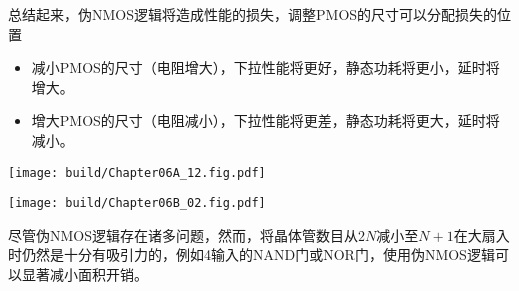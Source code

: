 总结起来，伪NMOS逻辑将造成性能的损失，调整PMOS的尺寸可以分配损失的位置
\begin{itemize}
    \item 减小PMOS的尺寸（电阻增大），下拉性能将更好，静态功耗将更小，延时将增大。
    \item 增大PMOS的尺寸（电阻减小），下拉性能将更差，静态功耗将更大，延时将减小。
\end{itemize}

\begin{Figure}[反相器的两种不同实现方式]
    \begin{FigureSub}[互补CMOS逻辑的反相器]
        \hspace{1cm}
        \texttt{[image: build/Chapter06A\_12.fig.pdf]}
        \hspace{1cm}
    \end{FigureSub}
    \begin{FigureSub}[伪NMOS逻辑的反相器]
        \hspace{1cm}
        \texttt{[image: build/Chapter06B\_02.fig.pdf]}
        \hspace{1cm}
    \end{FigureSub}
\end{Figure}

尽管伪NMOS逻辑存在诸多问题，然而，将晶体管数目从$2N$减小至$N+1$在大扇入时仍然是十分有吸引力的，例如4输入的NAND门或NOR门，使用伪NMOS逻辑可以显著减小面积开销。